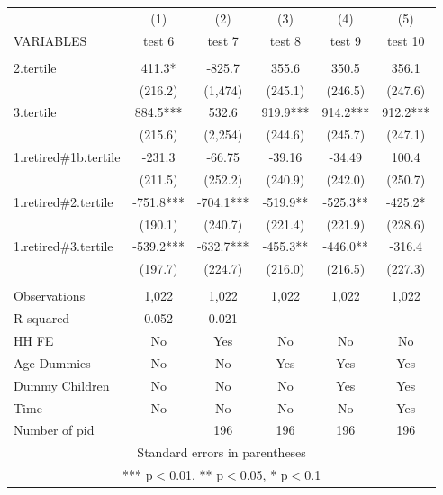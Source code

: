 \begin{tabular}{lccccc} \hline
 & (1) & (2) & (3) & (4) & (5) \\
VARIABLES & test 6 & test 7 & test 8 & test 9 & test 10 \\ \hline
 &  &  &  &  &  \\
2.tertile & 411.3* & -825.7 & 355.6 & 350.5 & 356.1 \\
 & (216.2) & (1,474) & (245.1) & (246.5) & (247.6) \\
3.tertile & 884.5*** & 532.6 & 919.9*** & 914.2*** & 912.2*** \\
 & (215.6) & (2,254) & (244.6) & (245.7) & (247.1) \\
1.retired\#1b.tertile & -231.3 & -66.75 & -39.16 & -34.49 & 100.4 \\
 & (211.5) & (252.2) & (240.9) & (242.0) & (250.7) \\
1.retired\#2.tertile & -751.8*** & -704.1*** & -519.9** & -525.3** & -425.2* \\
 & (190.1) & (240.7) & (221.4) & (221.9) & (228.6) \\
1.retired\#3.tertile & -539.2*** & -632.7*** & -455.3** & -446.0** & -316.4 \\
 & (197.7) & (224.7) & (216.0) & (216.5) & (227.3) \\
 &  &  &  &  &  \\
Observations & 1,022 & 1,022 & 1,022 & 1,022 & 1,022 \\
R-squared & 0.052 & 0.021 &  &  &  \\
HH FE & No & Yes & No & No & No \\
Age Dummies & No & No & Yes & Yes & Yes \\
Dummy Children & No & No & No & Yes & Yes \\
Time & No & No & No & No & Yes \\
 Number of pid &  & 196 & 196 & 196 & 196 \\ \hline
\multicolumn{6}{c}{ Standard errors in parentheses} \\
\multicolumn{6}{c}{ *** p$<$0.01, ** p$<$0.05, * p$<$0.1} \\
\end{tabular}
